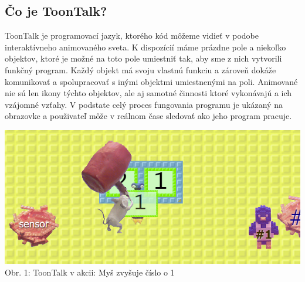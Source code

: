 \documentclass[slovak,a4paper,11pt]{article}
\begin{document}
\subsection{Čo je ToonTalk?}
ToonTalk je programovací jazyk, ktorého kód môžeme vidieť v podobe interaktívneho animovaného sveta. K dispozícií máme prázdne pole a niekoľko objektov, ktoré je možné na toto pole umiestniť tak, aby sme z nich vytvorili funkčný program. Každý objekt má svoju vlastnú funkciu a zároveň dokáže komunikovať a spolupracovať s inými objektmi umiestnenými na poli. Animované nie sú len ikony týchto objektov, ale aj samotné činnosti ktoré vykonávajú a ich vzájomné vzťahy. V podstate celý proces fungovania programu je ukázaný na obrazovke a použivateľ môže v reálnom čase sledovať ako jeho program pracuje. \\
\begin{center}
\includegraphics[scale=0.4]{toontalkmain}
\\ Obr. 1: ToonTalk v akcii: Myš zvyšuje číslo o 1
\end{center}
\end{document}
